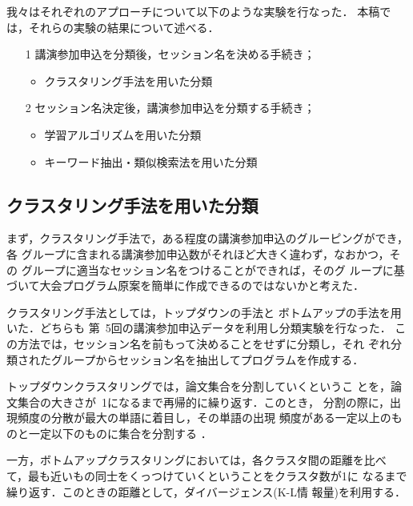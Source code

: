 我々はそれぞれのアプローチについて以下のような実験を行なった．
本稿では，それらの実験の結果について述べる．

\begin{itemize}
\item[1] 講演参加申込を分類後，セッション名を決める手続き；
\begin{itemize}
\item クラスタリング手法を用いた分類
\end{itemize}
\item[2] セッション名決定後，講演参加申込を分類する手続き；
\begin{itemize}
\item 学習アルゴリズムを用いた分類
\item キーワード抽出・類似検索法を用いた分類
\end{itemize}
\end{itemize}

\subsection{クラスタリング手法を用いた分類}
\label{class}
まず，クラスタリング手法で，ある程度の講演参加申込のグルーピングができ，各
グループに含まれる講演参加申込数がそれほど大きく違わず，なおかつ，その
グループに適当なセッション名をつけることができれば，そのグ
ループに基づいて大会プログラム原案を簡単に作成できるのではないかと考えた．

クラスタリング手法としては，トップダウンの手法\cite{Tanaka1997}と
ボトムアップの手法\cite{BakerAndMcCallum1998}を用いた．どちらも
第\ 5回の講演参加申込データを利用し分類実験を行なった．
この方法では，セッション名を前もって決めることをせずに分類し，それ
ぞれ分類されたグループからセッション名を抽出してプログラムを作成する．

トップダウンクラスタリングでは，論文集合を分割していくというこ
とを，論文集合の大きさが\ 1になるまで再帰的に繰り返す．このとき，
分割の際に，出現頻度の分散が最大の単語に着目し，その単語の出現
頻度がある一定以上のものと一定以下のものに集合を分割する
\cite{Tanaka1997}．

一方，ボトムアップクラスタリングにおいては，各クラスタ間の距離を比べ
て，最も近いもの同士をくっつけていくということをクラスタ数が1に
なるまで繰り返す．このときの距離として，ダイバージェンス(K-L情
報量)を利用する\cite{BakerAndMcCallum1998}．

